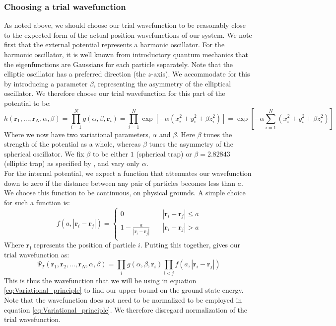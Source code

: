 \documentclass[a4paper, 10pt]{article}
\begin{document}
	\subsubsection{Choosing a trial wavefunction}
	As noted above, we should choose our trial wavefunction to be reasonably close to the expected form of the actual position wavefunctions of our system. We note first that the external potential represents a harmonic oscillator. For the harmonic oscillator, it is well known from introductory quantum mechanics that the eigenfunctions are Gaussians for each particle separately. Note that the elliptic oscillator has a preferred direction (the $z$-axis). We accommodate for this by introducing a parameter $\beta$, representing the asymmetry of the elliptical oscillator. We therefore choose our trial wavefunction for this part of the potential to be:
	\begin{equation}
	h(\boldsymbol{r}_1, ..., \boldsymbol{r}_N, \alpha, \beta)=\prod_{i=1}^N g(\alpha,\beta, \boldsymbol{r}_i)=\prod_{i=1}^N \exp[-\alpha(x_i^2+y_i^2+\beta z_i^2)]=\exp[-\alpha \sum_{i=1}^N (x_i^2+y_i^2+\beta z_i^2)]
	\end{equation}
	Where we now have two variational parameters, $\alpha$ and $\beta$. Here $\beta$ tunes the strength of the potential as a whole, whereas $\beta$ tunes the asymmetry of the spherical oscillator. We fix $\beta$ to be either $1$ (spherical trap) or $\beta=2.82843$ (elliptic trap) as specified by \cite{Nilsen2005}, and vary only $\alpha$.\\
	\linebreak
	For the internal potential, we expect a function that attenuates our wavefunction down to zero if the distance between any pair of particles becomes less than $a$. We choose this function to be continuous, on physical grounds. A simple choice for such a function is:
	\begin{equation}
	f(a,|\boldsymbol{r}_i-\boldsymbol{r}_j|)= 
	\begin{cases}
	0 & \quad |\boldsymbol{r}_i-\boldsymbol{r}_j| \leq  a\\
	1-\frac{a}{|\boldsymbol{r}_i-\boldsymbol{r}_j|} & \quad |\boldsymbol{r}_i-\boldsymbol{r}_j|>  a\\
	\end{cases}
	\end{equation}
	Where $\boldsymbol{r_i}$ represents the position of particle $i$. Putting this together, gives our trial wavefunction as:
	\begin{equation}\label{eq:trial_wavefunction}
	\Psi_T(\boldsymbol{r}_1, \boldsymbol{r}_2, ..., \boldsymbol{r}_N, \alpha, \beta)=\prod_ig(\alpha,\beta, \boldsymbol{r}_i)\prod_{i<j}f(a, |\boldsymbol{r}_i-\boldsymbol{r}_j|)
	\end{equation}
	This is thus the wavefunction that we will be using in equation \ref{eq:Variational_principle} to find our upper bound on the ground state energy. Note that the wavefunction does not need to be normalized to be employed in equation \ref{eq:Variational_principle}. We therefore disregard normalization of the trial wavefunction.
\end{document}
